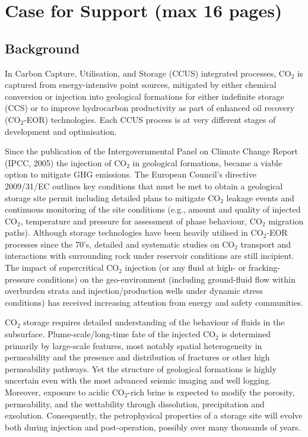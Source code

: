 \documentclass[12pts,a4paper,amsmath,amssymb,floatfix]{article}%
\newcommand{\CO}{CO\ensuremath{_{2}}}
\begin{document}
\clearpage

\section{Case for Support (max 16 pages)}

\subsection{Background}

In Carbon Capture, Utilisation, and Storage (CCUS) integrated processes, \CO\; is captured from energy-intensive point sources, mitigated by either chemical conversion or injection into geological formations for either indefinite storage (CCS) or to improve hydrocarbon productivity as part of enhanced oil recovery (\CO-EOR) technologies. Each CCUS process is at very different stages of development and optimisation.

Since the publication of the Intergovernmental Panel on Climate Change Report (IPCC, 2005) the injection of \CO\; in geological formations, became a viable option to mitigate GHG emissions. The European Council's directive 2009/31/EC outlines key conditions that must be met to obtain a geological storage site permit including detailed plans to mitigate \CO\; leakage events and continuous monitoring of the site conditions (e.g., amount and quality of injected \CO, temperature and pressure for assessment of phase behaviour, \CO\; migration paths). Although storage technologies have been heavily utilised in \CO-EOR processes since the 70's, detailed and systematic studies on \CO\; transport and interactions with surrounding rock under reservoir conditions are still incipient. The impact of supercritical \CO\; injection (or any fluid at high- or fracking-pressure conditions) on the geo-environment (including ground-fluid flow within overburden strata and injection/production wells under dynamic stress conditions) has received increasing attention from energy and safety communities.

\CO\; storage requires detailed understanding of the behaviour of fluids in the subsurface.  Plume-scale/long-time fate of the injected \CO\; is determined primarily by large-scale features, most notably spatial heterogeneity in permeability and the presence and distribution of fractures or other high permeability pathways.  Yet the structure of geological formations is highly uncertain even with the most advanced seismic imaging and well logging.  Moreover, exposure to acidic \CO-rich brine is expected to modify the porosity, permeability, and the wettability through dissolution, precipitation and exsolution.  Consequently, the petrophysical properties of a storage site will evolve both during injection and post-operation, possibly over many thousands of years.  
\end{document}
